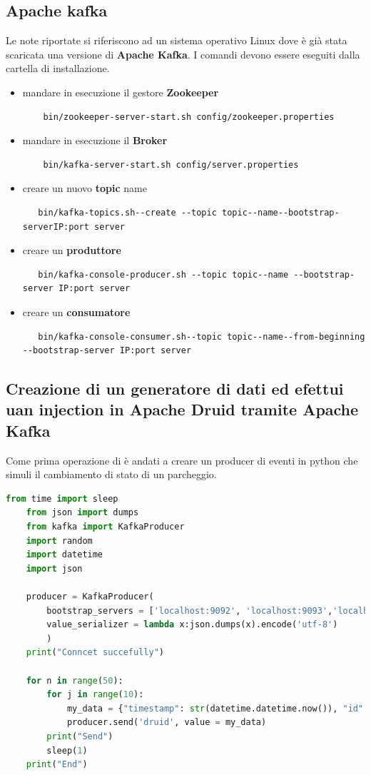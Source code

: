 \documentclass{article}
\begin{document}
\subsection{Apache kafka}
Le note riportate si riferiscono ad un sistema operativo Linux dove è già stata scaricata una versione di \textbf{Apache Kafka}. I comandi devono essere eseguiti dalla cartella di installazione.
\begin{itemize}
    \item mandare in esecuzione il gestore \textbf{Zookeeper}
    \begin{lstlisting}
    bin/zookeeper-server-start.sh config/zookeeper.properties\end{lstlisting}
    \item mandare in esecuzione il \textbf{Broker}
    \begin{lstlisting}
    bin/kafka-server-start.sh config/server.properties\end{lstlisting}
    \item creare un nuovo \textbf{topic} name
   \noindent \begin{lstlisting}
   bin/kafka-topics.sh--create --topic topic--name--bootstrap-serverIP:port server \end{lstlisting}
   \item creare un \textbf{produttore} 
   \begin{lstlisting}
   bin/kafka-console-producer.sh --topic topic--name --bootstrap-server IP:port server \end{lstlisting}
   \item creare un \textbf{consumatore}
   \begin{lstlisting}
   bin/kafka-console-consumer.sh--topic topic--name--from-beginning --bootstrap-server IP:port server
   \end{lstlisting}

\end{itemize}
\pagebreak
\subsection{Creazione di un generatore di dati ed efettui uan injection in Apache Druid tramite Apache Kafka}
Come prima operazione di è andati a creare un producer di eventi in python che simuli il cambiamento di stato di un parcheggio.
\begin{lstlisting}[language=Python]
    from time import sleep  
    from json import dumps  
    from kafka import KafkaProducer  
    import random
    import datetime
    import json
    
    producer = KafkaProducer(  
        bootstrap_servers = ['localhost:9092', 'localhost:9093','localhost:9094'],  
        value_serializer = lambda x:json.dumps(x).encode('utf-8')  
        )  
    print("Conncet succefully") 
    
    for n in range(50):  
        for j in range(10):
            my_data = {"timestamp": str(datetime.datetime.now()), "id" : str(random.randint(0,999)),"value": random.randint(0,1)} 
            producer.send('druid', value = my_data) 
        print("Send")
        sleep(1) 
    print("End")
         
    

\end{lstlisting}
\end{document}
